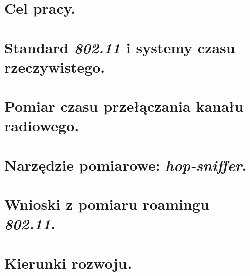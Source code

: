 \documentclass[11pt,a4paper,oneside]{report}
\begin{document}

%
%
%

\tableofcontents

\newpage
\thispagestyle{empty}
\mbox{}


\chapter{Cel pracy.}


\chapter{Standard \emph{802.11} i systemy czasu rzeczywistego.}


\chapter{Pomiar czasu przełączania kanału radiowego.}


\chapter{Narzędzie pomiarowe: \emph{hop-sniffer}.}


\chapter{Wnioski z pomiaru roamingu \emph{802.11}.}


\chapter{Kierunki rozwoju.}


\nocite{*}

\end{document}
